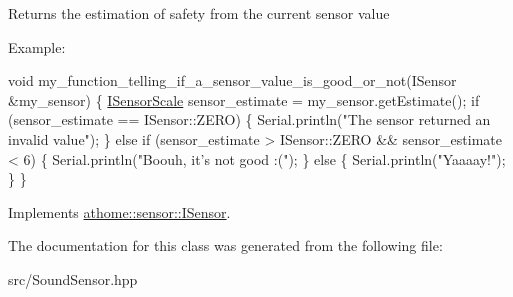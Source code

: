 Returns the estimation of safety from the current sensor value

Example\+:


\begin{DoxyCode}
\textcolor{keywordtype}{void} my\_function\_telling\_if\_a\_sensor\_value\_is\_good\_or\_not(ISensor
&my\_sensor) \{ \mbox{\hyperlink{classathome_1_1sensor_1_1_i_sensor_aa70bc27a4c17c86caf96cca776541ddf}{ISensorScale}} sensor\_estimate = my\_sensor.getEstimate(); \textcolor{keywordflow}{if}
(sensor\_estimate == ISensor::ZERO) \{ Serial.println(\textcolor{stringliteral}{"The sensor returned an}
\textcolor{stringliteral}{invalid value"});
  \}
  \textcolor{keywordflow}{else} \textcolor{keywordflow}{if} (sensor\_estimate > ISensor::ZERO && sensor\_estimate < 6) \{
    Serial.println(\textcolor{stringliteral}{"Boouh, it's not good :("});
  \}
  \textcolor{keywordflow}{else} \{
    Serial.println(\textcolor{stringliteral}{"Yaaaay!"});
  \}
\}
\end{DoxyCode}
 

Implements \mbox{\hyperlink{classathome_1_1sensor_1_1_i_sensor_af86df8538fecfcfc670b4adfbbde6abb}{athome\+::sensor\+::\+I\+Sensor}}.



The documentation for this class was generated from the following file\+:\begin{DoxyCompactItemize}
\item 
src/Sound\+Sensor.\+hpp\end{DoxyCompactItemize}
